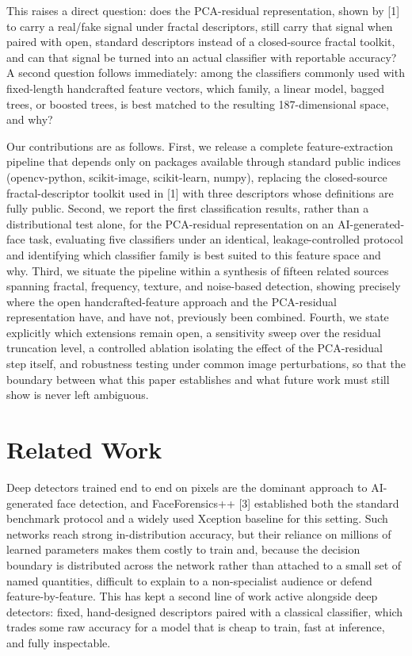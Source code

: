 \documentclass[11pt]{article}
\begin{document}
This raises a direct question: does the PCA-residual representation, shown by [1] to carry a real/fake signal under fractal descriptors, still carry that signal when paired with open, standard descriptors instead of a closed-source fractal toolkit, and can that signal be turned into an actual classifier with reportable accuracy? A second question follows immediately: among the classifiers commonly used with fixed-length handcrafted feature vectors, which family, a linear model, bagged trees, or boosted trees, is best matched to the resulting 187-dimensional space, and why?

Our contributions are as follows. First, we release a complete feature-extraction pipeline that depends only on packages available through standard public indices (opencv-python, scikit-image, scikit-learn, numpy), replacing the closed-source fractal-descriptor toolkit used in [1] with three descriptors whose definitions are fully public. Second, we report the first classification results, rather than a distributional test alone, for the PCA-residual representation on an AI-generated-face task, evaluating five classifiers under an identical, leakage-controlled protocol and identifying which classifier family is best suited to this feature space and why. Third, we situate the pipeline within a synthesis of fifteen related sources spanning fractal, frequency, texture, and noise-based detection, showing precisely where the open handcrafted-feature approach and the PCA-residual representation have, and have not, previously been combined. Fourth, we state explicitly which extensions remain open, a sensitivity sweep over the residual truncation level, a controlled ablation isolating the effect of the PCA-residual step itself, and robustness testing under common image perturbations, so that the boundary between what this paper establishes and what future work must still show is never left ambiguous.

\section{Related Work}

Deep detectors trained end to end on pixels are the dominant approach to AI-generated face detection, and FaceForensics++ [3] established both the standard benchmark protocol and a widely used Xception baseline for this setting. Such networks reach strong in-distribution accuracy, but their reliance on millions of learned parameters makes them costly to train and, because the decision boundary is distributed across the network rather than attached to a small set of named quantities, difficult to explain to a non-specialist audience or defend feature-by-feature. This has kept a second line of work active alongside deep detectors: fixed, hand-designed descriptors paired with a classical classifier, which trades some raw accuracy for a model that is cheap to train, fast at inference, and fully inspectable.
\end{document}
